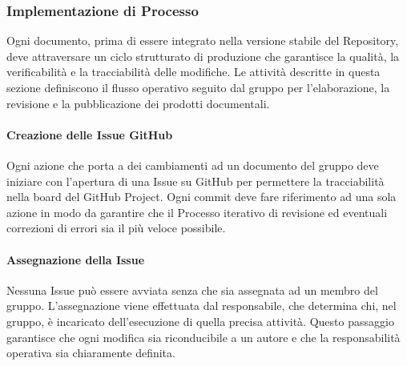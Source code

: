 \documentclass[a4paper,12pt]{article}
\newcommand{\ignoreglossary}{}
\begin{document}
\subsubsection{Implementazione di Processo}
Ogni documento, prima di essere integrato nella versione stabile del Repository, deve attraversare un ciclo strutturato di produzione che garantisce la qualità, la verificabilità e la tracciabilità delle modifiche. Le attività descritte in questa sezione definiscono il flusso operativo seguito dal gruppo per l’elaborazione, la revisione e la pubblicazione dei prodotti documentali.

\paragraph{Creazione delle \ignoreglossary{Issue} GitHub}
Ogni azione che porta a dei cambiamenti ad un documento del gruppo deve iniziare con l’apertura di una Issue su GitHub per permettere la tracciabilità nella board del GitHub Project. Ogni commit deve fare riferimento ad una sola azione in modo da garantire che il Processo iterativo di revisione ed eventuali correzioni di errori sia il più veloce possibile.

\paragraph{Assegnazione della \ignoreglossary{Issue}} 
Nessuna Issue può essere avviata senza che sia assegnata ad un membro del gruppo. L’assegnazione viene effettuata dal responsabile, che determina chi, nel gruppo, è incaricato dell’esecuzione di quella precisa attività. Questo passaggio garantisce che ogni modifica sia riconducibile a un autore e che la responsabilità operativa sia chiaramente definita.
\end{document}
